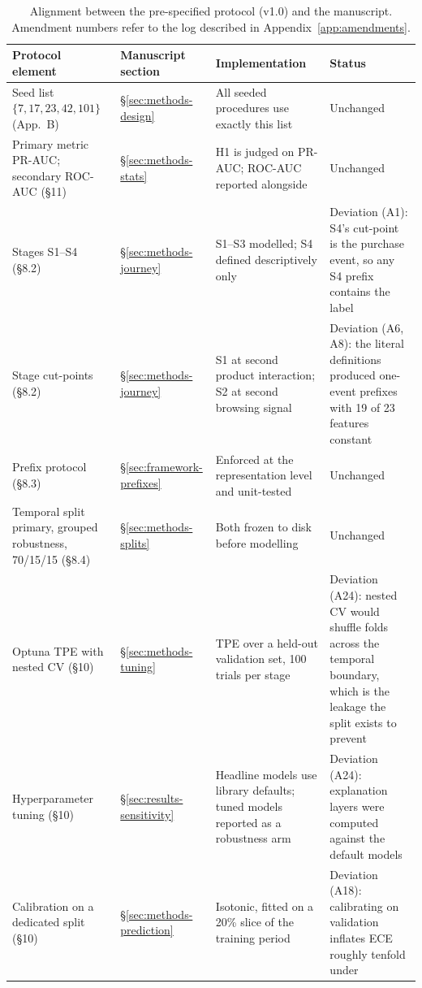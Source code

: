 \documentclass[a4paper]{article}
\begin{document}
\begin{table}[htbp]
\centering
\caption{Alignment between the pre-specified protocol (v1.0) and the
manuscript. Amendment numbers refer to the log described in
Appendix~\ref{app:amendments}.}
\label{tab:alignment}
\scriptsize
\begin{tabular}{@{}p{3.0cm}p{2.5cm}p{5.4cm}p{3.4cm}@{}}
\toprule
\textbf{Protocol element} & \textbf{Manuscript section} &
\textbf{Implementation} & \textbf{Status} \\
\midrule
Seed list $\{7,17,23,42,101\}$ (App.~B) & \S\ref{sec:methods-design} &
All seeded procedures use exactly this list & Unchanged \\
\addlinespace
Primary metric PR-AUC; secondary ROC-AUC (\S11) & \S\ref{sec:methods-stats} &
H1 is judged on PR-AUC; ROC-AUC reported alongside & Unchanged \\
\addlinespace
Stages S1--S4 (\S8.2) & \S\ref{sec:methods-journey} &
S1--S3 modelled; S4 defined descriptively only & Deviation (A1): S4's
cut-point is the purchase event, so any S4 prefix contains the label \\
\addlinespace
Stage cut-points (\S8.2) & \S\ref{sec:methods-journey} &
S1 at second product interaction; S2 at second browsing signal &
Deviation (A6, A8): the literal definitions produced one-event prefixes with
19 of 23 features constant \\
\addlinespace
Prefix protocol (\S8.3) & \S\ref{sec:framework-prefixes} &
Enforced at the representation level and unit-tested & Unchanged \\
\addlinespace
Temporal split primary, grouped robustness, 70/15/15 (\S8.4) &
\S\ref{sec:methods-splits} & Both frozen to disk before modelling &
Unchanged \\
\addlinespace
Optuna TPE with nested CV (\S10) & \S\ref{sec:methods-tuning} &
TPE over a held-out validation set, 100 trials per stage &
Deviation (A24): nested CV would shuffle folds across the temporal boundary,
which is the leakage the split exists to prevent \\
\addlinespace
Hyperparameter tuning (\S10) & \S\ref{sec:results-sensitivity} &
Headline models use library defaults; tuned models reported as a robustness
arm & Deviation (A24): explanation layers were computed against the default
models \\
\addlinespace
Calibration on a dedicated split (\S10) & \S\ref{sec:methods-prediction} &
Isotonic, fitted on a 20\% slice of the training period &
Deviation (A18): calibrating on validation inflates ECE roughly tenfold under

\end{tabular}
\end{table}
\end{document}
